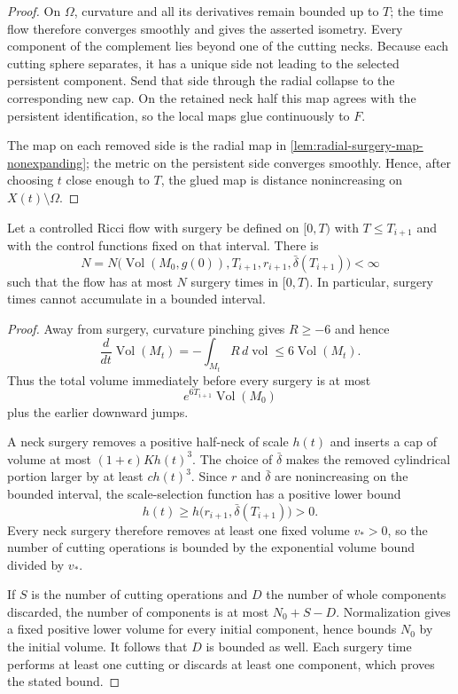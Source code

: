 \begin{proof}
On $\Omega$, curvature and all its derivatives remain bounded up to $T$;
the time flow therefore converges smoothly and gives the asserted isometry.
Every component of the complement lies beyond one of the cutting necks.
Because each cutting sphere separates, it has a unique side not leading to
the selected persistent component.  Send that side through the radial
collapse to the corresponding new cap.  On the retained neck half this map
agrees with the persistent identification, so the local maps glue
continuously to $F$.

The map on each removed side is the radial map in
\ref{lem:radial-surgery-map-nonexpanding}; the metric on the persistent side
converges smoothly.  Hence, after choosing $t$ close enough to $T$, the glued
map is distance nonincreasing on $X(t)\setminus\Omega$.
\end{proof}

\begin{theorem}
\label{thm:finite-interval-surgery-bound}
\notready
Let a controlled Ricci flow with surgery be defined on $[0,T)$ with
$T\le T_{i+1}$ and with the control functions fixed on that interval.  There
is
\[
 N=N\bigl(\operatorname{Vol}(M_0,g(0)),T_{i+1},r_{i+1},
             \bar\delta(T_{i+1})\bigr)<\infty
\]
such that the flow has at most $N$ surgery times in $[0,T)$.  In particular,
surgery times cannot accumulate in a bounded interval.
\end{theorem}

\begin{proof}
Away from surgery, curvature pinching gives $R\ge-6$ and hence
\[
 \frac d{dt}\operatorname{Vol}(M_t)
 =-\int_{M_t}R\,d\operatorname{vol}
 \le6\operatorname{Vol}(M_t).
\]
Thus the total volume immediately before every surgery is at most
\[
 e^{6T_{i+1}}\operatorname{Vol}(M_0)
\]
plus the earlier downward jumps.

A neck surgery removes a positive half-neck of scale $h(t)$ and inserts a
cap of volume at most $(1+\epsilon)Kh(t)^3$.  The choice of
$\bar\delta$ makes the removed cylindrical portion larger by at least
$c h(t)^3$.  Since $r$ and $\bar\delta$ are nonincreasing on the bounded
interval, the scale-selection function has a positive lower bound
\[
 h(t)\ge h\bigl(r_{i+1},\bar\delta(T_{i+1})\bigr)>0.
\]
Every neck surgery therefore removes at least one fixed volume $v_*>0$, so
the number of cutting operations is bounded by the exponential volume bound
divided by $v_*$.

If $S$ is the number of cutting operations and $D$ the number of whole
components discarded, the number of components is at most $N_0+S-D$.
Normalization gives a fixed positive lower volume for every initial
component, hence bounds $N_0$ by the initial volume.  It follows that $D$ is
bounded as well.  Each surgery time performs at least one cutting or discards
at least one component, which proves the stated bound.
\end{proof}

